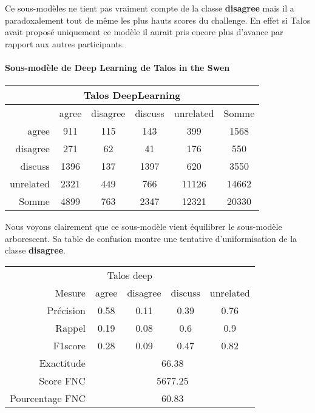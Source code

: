 \documentclass[onecolumn, 12pt]{article}
\begin{document}
Ce sous-modèles ne tient pas vraiment compte de la classe \textbf{disagree} mais il a paradoxalement tout de même les plus hauts scores du challenge. En effet si Talos avait proposé uniquement ce modèle il aurait pris encore plus  d'avance par rapport aux autres participants.
\paragraph{Sous-modèle de Deep Learning de Talos in the Swen}
\begin{center}
 \begin{tabular}{ r | c c c c | c }
  \multicolumn{6}{c}{Talos DeepLearning}                     \\
  \hline
            & agree & disagree & discuss & unrelated & Somme \\
  \hline
  agree     & 911   & 115      & 143     & 399       & 1568  \\
  disagree  & 271   & 62       & 41      & 176       & 550   \\
  discuss   & 1396  & 137      & 1397    & 620       & 3550  \\
  unrelated & 2321  & 449      & 766     & 11126     & 14662 \\
  \hline
  Somme     & 4899  & 763      & 2347    & 12321     & 20330 \\
 \end{tabular}
\end{center}



Nous voyons clairement que ce sous-modèle vient équilibrer le sous-modèle arborescent. Sa table de confusion montre une tentative d'uniformisation de la classe \textbf{disagree}.
\begin{center}
 \begin{tabular}{ r | c c c c }
  \multicolumn{5}{c}{Talos deep}                                                 \\
  Mesure          & agree                       & disagree & discuss & unrelated \\
  \hline
  Précision       & 0.58                        & 0.11     & 0.39    & 0.76      \\
  Rappel          & 0.19                        & 0.08     & 0.6     & 0.9       \\
  F1score         & 0.28                        & 0.09     & 0.47    & 0.82      \\
  \hline
  \hline
  Exactitude      & \multicolumn{4}{c}{66.38}                                    \\
  Score FNC       & \multicolumn{4}{c}{5677.25}                                  \\
  Pourcentage FNC & \multicolumn{4}{c}{60.83}                                    \\
 \end{tabular}
\end{center}
\end{document}
